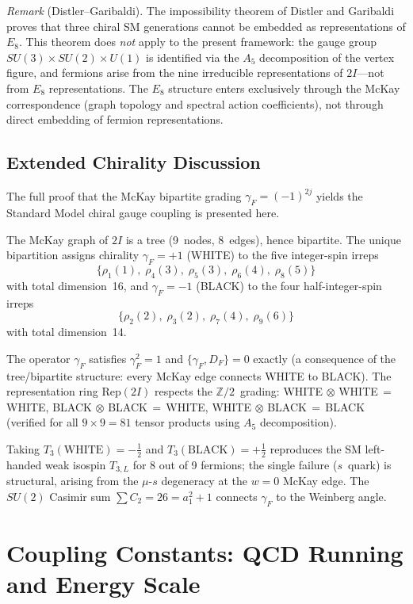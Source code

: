 \documentclass[12pt,a4paper]{article}
\theoremstyle{definition}
\begin{document}
\noindent\textit{Remark} (Distler--Garibaldi).  The impossibility theorem of Distler and Garibaldi~\cite{distler2010} proves that three chiral SM generations cannot be embedded as representations of $E_8$.  This theorem does \emph{not} apply to the present framework: the gauge group $SU(3) \times SU(2) \times U(1)$ is identified via the $A_5$ decomposition of the vertex figure, and fermions arise from the nine irreducible representations of $2I$---not from $E_8$ representations.  The $E_8$ structure enters exclusively through the McKay correspondence (graph topology and spectral action coefficients), not through direct embedding of fermion representations.

\subsection{Extended Chirality Discussion}

The full proof that the McKay bipartite grading $\gamma_F = (-1)^{2j}$ yields the Standard Model chiral gauge coupling is presented here.

The McKay graph of $2I$ is a tree (9~nodes, 8~edges), hence bipartite.  The unique bipartition assigns chirality $\gamma_F = +1$ (WHITE) to the five integer-spin irreps
\[
\{\rho_1(1),\; \rho_4(3),\; \rho_5(3),\; \rho_6(4),\; \rho_8(5)\}
\]
with total dimension~16, and $\gamma_F = -1$ (BLACK) to the four half-integer-spin irreps
\[
\{\rho_2(2),\; \rho_3(2),\; \rho_7(4),\; \rho_9(6)\}
\]
with total dimension~14.

The operator $\gamma_F$ satisfies $\gamma_F^2 = 1$ and $\{\gamma_F, D_F\} = 0$ exactly (a consequence of the tree/bipartite structure: every McKay edge connects WHITE to BLACK).  The representation ring $\text{Rep}(2I)$ respects the $\mathbb{Z}/2$~grading: WHITE$\,\otimes\,$WHITE$\,=\,$WHITE, BLACK$\,\otimes\,$BLACK$\,=\,$WHITE, WHITE$\,\otimes\,$BLACK$\,=\,$BLACK (verified for all $9 \times 9 = 81$ tensor products using $A_5$ decomposition).

Taking $T_3(\text{WHITE}) = -\tfrac{1}{2}$ and $T_3(\text{BLACK}) = +\tfrac{1}{2}$ reproduces the SM left-handed weak isospin $T_{3,L}$ for 8 out of 9 fermions; the single failure ($s$~quark) is structural, arising from the $\mu$-$s$ degeneracy at the $w = 0$ McKay edge.  The $SU(2)$ Casimir sum $\sum C_2 = 26 = a_1^2 + 1$ connects $\gamma_F$ to the Weinberg angle.


\section{Coupling Constants: QCD Running and Energy Scale}
\label{sec:S-coupling}
\end{document}
